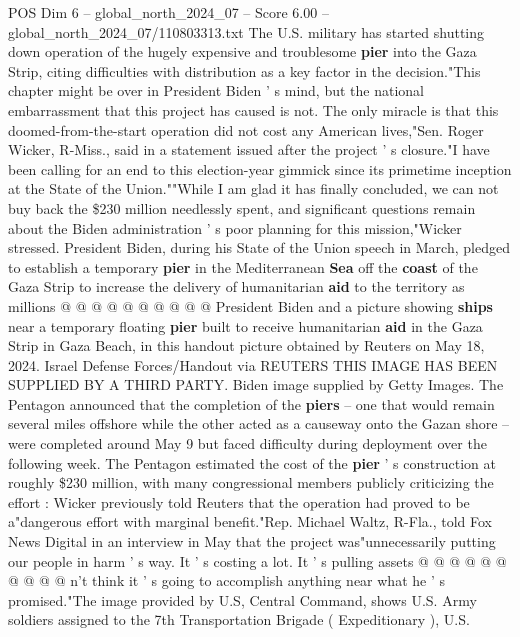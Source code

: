 \begin{textsample}{POS Dim 6 – global\_north\_2024\_07 – Score 6.00 – global\_north\_2024\_07/110803313.txt}  \label{ex:f6_pos_308}
The U.S. military has started shutting down operation of the hugely expensive and troublesome \textbf{pier} into the Gaza Strip, citing difficulties with distribution as a key factor in the decision."This chapter might be over in President Biden ' s mind, but the national embarrassment that this project has caused is not.
The only miracle is that this doomed-from-the-start operation did not cost any American lives,"Sen.
Roger Wicker, R-Miss., said in a statement issued after the project ' s closure."I have been calling for an end to this election-year gimmick since its primetime inception at the State of the Union.""While I am glad it has finally concluded, we can not buy back the \$230 million needlessly spent, and significant questions remain about the Biden administration ' s poor planning for this mission,"Wicker stressed.
President Biden, during his State of the Union speech in March, pledged to establish a temporary \textbf{pier} in the Mediterranean \textbf{Sea} off the \textbf{coast} of the Gaza Strip to increase the delivery of humanitarian \textbf{aid} to the territory as millions @ @ @ @ @ @ @ @ @ @ President Biden and a picture showing \textbf{ships} near a temporary floating \textbf{pier} built to receive humanitarian \textbf{aid} in the Gaza Strip in Gaza Beach, in this handout picture obtained by Reuters on May 18, 2024.
Israel Defense Forces/Handout via REUTERS THIS IMAGE HAS BEEN SUPPLIED BY A THIRD PARTY.
Biden image supplied by Getty Images.
The Pentagon announced that the completion of the \textbf{piers} -- one that would remain several miles offshore while the other acted as a causeway onto the Gazan shore -- were completed around May 9 but faced difficulty during deployment over the following week.
The Pentagon estimated the cost of the \textbf{pier} ' s construction at roughly \$230 million, with many congressional members publicly criticizing the effort : Wicker previously told Reuters that the operation had proved to be a"dangerous effort with marginal benefit."Rep.
Michael Waltz, R-Fla., told Fox News Digital in an interview in May that the project was"unnecessarily putting our people in harm ' s way.
It ' s costing a lot.
It ' s pulling assets @ @ @ @ @ @ @ @ @ @ n't think it ' s going to accomplish anything near what he ' s promised."The image provided by U.S, Central Command, shows U.S.
Army soldiers assigned to the 7th Transportation Brigade ( Expeditionary ), U.S.

\end{textsample}
